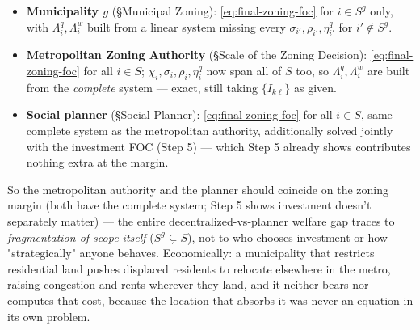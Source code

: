 \documentclass[12pt, a4paper]{article}
\theoremstyle{definition}
\begin{document}
\begin{itemize}
\item \textbf{Municipality $g$} (\S Municipal Zoning): \eqref{eq:final-zoning-foc} for $i\in S^g$ only, with $\Lambda_i^q,\Lambda_i^w$ built from a linear system missing every $\sigma_{i'},\rho_{i'},\eta_{i'}^q$ for $i'\notin S^g$.
\item \textbf{Metropolitan Zoning Authority} (\S Scale of the Zoning Decision): \eqref{eq:final-zoning-foc} for all $i\in S$; $\chi_i,\sigma_i,\rho_i,\eta_i^q$ now span all of $S$ too, so $\Lambda_i^q,\Lambda_i^w$ are built from the \emph{complete} system — exact, still taking $\{I_{k\ell}\}$ as given.
\item \textbf{Social planner} (\S Social Planner): \eqref{eq:final-zoning-foc} for all $i\in S$, same complete system as the metropolitan authority, additionally solved jointly with the investment FOC (Step 5) — which Step 5 already shows contributes nothing extra at the margin.
\end{itemize}
So the metropolitan authority and the planner should coincide on the zoning margin (both have the complete system; Step 5 shows investment doesn't separately matter) — the entire decentralized-vs-planner welfare gap traces to \emph{fragmentation of scope itself} ($S^g\subsetneq S$), not to who chooses investment or how "strategically" anyone behaves. Economically: a municipality that restricts residential land pushes displaced residents to relocate elsewhere in the metro, raising congestion and rents wherever they land, and it neither bears nor computes that cost, because the location that absorbs it was never an equation in its own problem.
\end{document}
